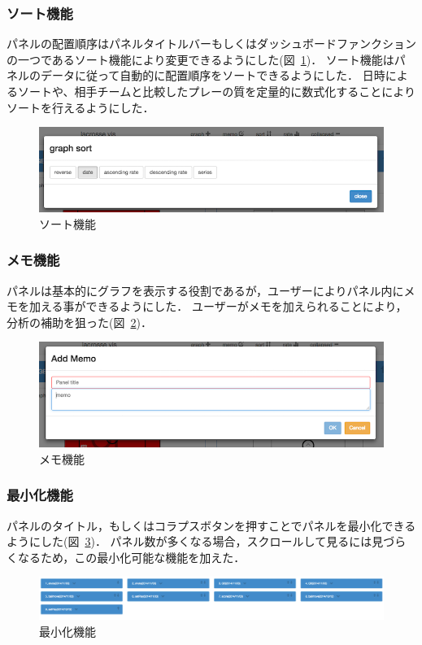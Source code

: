 \documentclass[sotsuron]{kuee}
\begin{document}
			\subsubsection{ソート機能}
				パネルの配置順序はパネルタイトルバーもしくはダッシュボードファンクションの一つであるソート機能により変更できるようにした(図~\ref{fig:sort})．
				ソート機能はパネルのデータに従って自動的に配置順序をソートできるようにした．
				日時によるソートや、相手チームと比較したプレーの質を定量的に数式化することによりソートを行えるようにした．
					\begin{figure}
						\begin{center}
							\includegraphics[width=\linewidth]{./png/sort.png}
						\end{center}
						\caption{ソート機能}
				  		\label{fig:sort}
					\end{figure}
			\subsubsection{メモ機能}
				パネルは基本的にグラフを表示する役割であるが，ユーザーによりパネル内にメモを加える事ができるようにした．
				ユーザーがメモを加えられることにより，分析の補助を狙った(図~\ref{fig:memo})．
					\begin{figure}
						\begin{center}
							\includegraphics[width=\linewidth]{./png/memo.png}
						\end{center}
						\caption{メモ機能}
				  		\label{fig:memo}
					\end{figure}
			\subsubsection{最小化機能}
				パネルのタイトル，もしくはコラプスボタンを押すことでパネルを最小化できるようにした(図~\ref{fig:collapse})．
				パネル数が多くなる場合，スクロールして見るには見づらくなるため，この最小化可能な機能を加えた．
					\begin{figure}
						\begin{center}
							\includegraphics[width=\linewidth]{./png/collapsed.png}
						\end{center}
						\caption{最小化機能}
				  		\label{fig:collapse}
					\end{figure}
\end{document}
